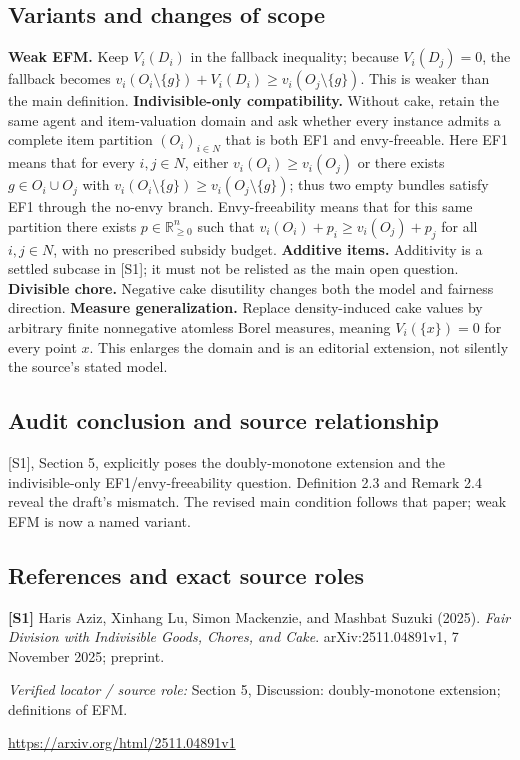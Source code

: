 \documentclass[11pt,a4paper]{article}
\begin{document}
\subsection*{Variants and changes of scope}

\textbf{Weak EFM.} Keep $V_i(D_i)$ in the fallback inequality; because $V_i(D_j)=0$, the fallback becomes $v_i(O_i\setminus\{g\})+V_i(D_i)\geq v_i(O_j\setminus\{g\})$. This is weaker than the main definition. \textbf{Indivisible-only compatibility.} Without cake, retain the same agent and item-valuation domain and ask whether every instance admits a complete item partition $(O_i)_{i\in N}$ that is both EF1 and envy-freeable. Here EF1 means that for every $i,j\in N$, either $v_i(O_i)\geq v_i(O_j)$ or there exists $g\in O_i\cup O_j$ with $v_i(O_i\setminus\{g\})\geq v_i(O_j\setminus\{g\})$; thus two empty bundles satisfy EF1 through the no-envy branch. Envy-freeability means that for this same partition there exists $p\in\mathbb R_{\geq0}^n$ such that $v_i(O_i)+p_i\geq v_i(O_j)+p_j$ for all $i,j\in N$, with no prescribed subsidy budget. \textbf{Additive items.} Additivity is a settled subcase in [S1]; it must not be relisted as the main open question. \textbf{Divisible chore.} Negative cake disutility changes both the model and fairness direction. \textbf{Measure generalization.} Replace density-induced cake values by arbitrary finite nonnegative atomless Borel measures, meaning $V_i(\{x\})=0$ for every point $x$. This enlarges the domain and is an editorial extension, not silently the source's stated model.

\subsection*{Audit conclusion and source relationship}

[S1], Section 5, explicitly poses the doubly-monotone extension and the indivisible-only EF1/envy-freeability question. Definition 2.3 and Remark 2.4 reveal the draft's mismatch. The revised main condition follows that paper; weak EFM is now a named variant.

\subsection*{References and exact source roles}

{\footnotesize\raggedright
\par\noindent\textbf{[S1]} Haris Aziz, Xinhang Lu, Simon Mackenzie, and Mashbat Suzuki (2025). \emph{Fair Division with Indivisible Goods, Chores, and Cake}. arXiv:2511.04891v1, 7 November 2025; preprint.\par \textit{Verified locator / source role:} Section 5, Discussion: doubly-monotone extension; definitions of EFM.\par \url{https://arxiv.org/html/2511.04891v1}\par\smallskip
}
\end{document}
